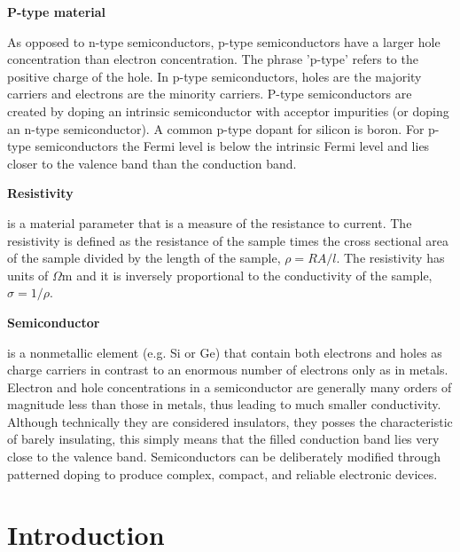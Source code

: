 \documentclass{../lab}
\begin{document}
\textbf{P-type material}

As opposed to n-type semiconductors, p-type semiconductors have a larger hole concentration than electron concentration. The phrase 'p-type' refers to the positive charge of the hole. In p-type semiconductors, holes are the majority carriers and electrons are the minority carriers. P-type semiconductors are created by doping an intrinsic semiconductor with acceptor impurities (or doping an n-type semiconductor). A common p-type dopant for silicon is boron. For p-type semiconductors the Fermi level is below the intrinsic Fermi level and lies closer to the valence band than the conduction band.

\textbf{Resistivity}

is a material parameter that is a measure of the resistance to current. The resistivity is defined as the resistance of the sample times the cross sectional area of the sample divided by the length of the sample, $\rho = RA/l$. The resistivity has units of $\Omega$m and it is inversely proportional to the conductivity of the sample, $\sigma = 1/\rho$.

\textbf{Semiconductor}

is a nonmetallic element (e.g. Si or Ge) that contain both electrons and holes as charge carriers in contrast to an enormous number of electrons only as in metals. Electron and hole concentrations in a semiconductor are generally many orders of magnitude less than those in metals, thus leading to much smaller conductivity. Although technically they are considered insulators, they posses the characteristic of barely insulating, this simply means that the filled conduction band lies very close to the valence band. Semiconductors can be deliberately modified through patterned doping to produce complex, compact, and reliable electronic devices.


\section{Introduction}
\end{document}
